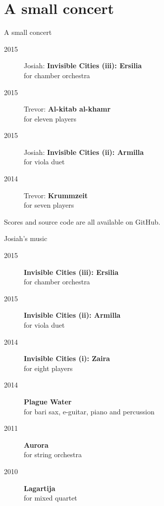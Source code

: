 \section{A small concert}

\begin{frame}{A small concert}
    \begin{description}
        \item[2015] Josiah: \textbf{Invisible Cities (iii): Ersilia} \\
            for chamber orchestra
        \item[2015] Trevor: \textbf{Al-kitab al-khamr} \\
            for eleven players
        \item[2015] Josiah: \textbf{Invisible Cities (ii): Armilla} \\
            for viola duet
        \item[2014] Trevor: \textbf{Krummzeit} \\
            for seven players
    \end{description}
    \begin{center}
        Scores and source code are all available on GitHub.
    \end{center}
\end{frame}

\begin{frame}{Josiah's music}
    \begin{description}
        \item[2015] \textbf{Invisible Cities (iii): Ersilia} \\
            for chamber orchestra
        \item[2015] \textbf{Invisible Cities (ii): Armilla} \\
            for viola duet
        \item[2014] \textbf{Invisible Cities (i): Zaira} \\
            for eight players
        \item[2014] \textbf{Plague Water} \\
            for bari sax, e-guitar, piano and percussion
        \item[2011] \textbf{Aurora} \\
            for string orchestra
        \item[2010] \textbf{Lagartija} \\
            for mixed quartet
    \end{description}
\end{frame}


